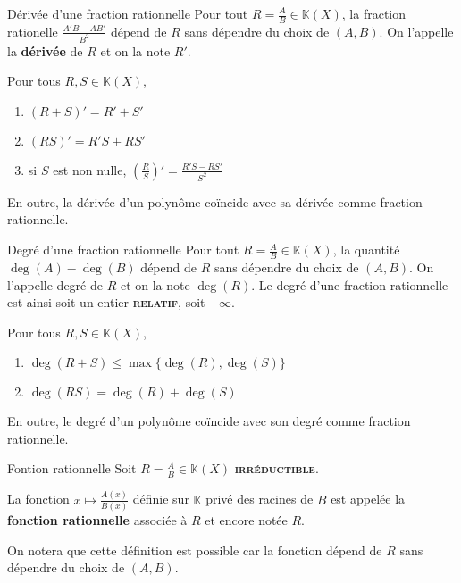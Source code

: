     \begin{defi}{Dérivée d’une fraction rationnelle}{}
        Pour tout $R = \frac{A}{B} \in \mathbb{K}(X)$, la fraction rationelle $\frac{A'B - AB'}{B^2}$ dépend de $R$ sans dépendre du choix de $(A,B)$. On l’appelle la \textbf{dérivée} de $R$ et on la note $R'$.
        
        Pour tous $R,S \in \mathbb{K}(X)$, 
        \begin{enumerate}
            \item $(R + S)' = R' + S'$
            \item $(RS)' = R'S + R S'$
            \item si $S$ est non nulle, $\left(\frac{R}{S}\right)' = \frac{R'S - RS'}{S^2}$
        \end{enumerate}
        En outre, la dérivée d’un polynôme coïncide avec sa dérivée comme fraction rationnelle.
    \end{defi}

    \begin{defi}{Degré d’une fraction rationnelle}{}
        Pour tout $R = \frac{A}{B} \in \mathbb{K}(X)$, la quantité $\deg(A) - \deg(B)$ dépend de $R$ sans dépendre du choix de $(A,B)$. On l’appelle degré de $R$ et on la note $\deg(R)$. Le degré d’une fraction rationnelle est ainsi soit un entier \textbf{\textsc{relatif}}, soit $-\infty$.

        Pour tous $R,S \in \mathbb{K}(X)$, 
        \begin{enumerate}
            \item $\deg(R+S) \leq \max \big\{ \deg(R), \deg(S) \big\}$
            \item $\deg(RS) = \deg(R) + \deg(S)$
        \end{enumerate}
        En outre, le degré d’un polynôme coïncide avec son degré comme fraction rationnelle.
    \end{defi}

    \begin{defi}{Fontion rationnelle}{}
        Soit $R = \frac{A}{B} \in \mathbb{K}(X)$ \textbf{\textsc{irréductible}}. 

        La fonction $x \longmapsto \frac{A(x)}{B(x)}$ définie sur $\mathbb{K}$ privé des racines de $B$ est appelée la \textbf{fonction rationnelle} associée à $R$ et encore notée $R$.
    \end{defi}

    On notera que cette définition est possible car la fonction dépend de $R$ sans dépendre du choix de $(A,B)$. 


